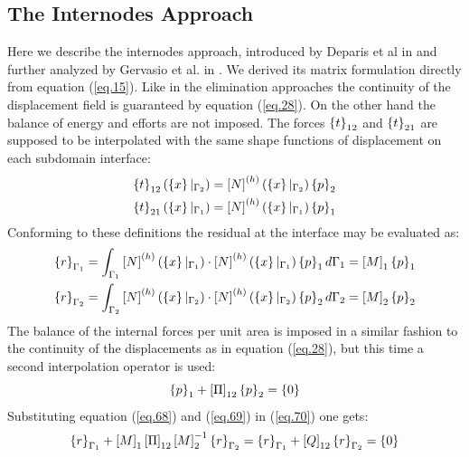 \subsection{The Internodes Approach}\label{ssec35}
Here we describe the internodes approach, introduced by Deparis et al in \cite{deparis2016internodes} and further analyzed by Gervasio et al. in \cite{gervasio2016analysis}. We derived its matrix formulation directly from equation (\ref{eq.15}). Like in the elimination approaches the continuity of the displacement field is guaranteed by equation (\ref{eq.28}). On the other hand the balance of energy and efforts are not imposed. The forces $\left\lbrace{t}\right \rbrace_{12}$ and $\left\lbrace{t}\right \rbrace_{21}$ are supposed to be interpolated with the same shape functions of displacement on each subdomain interface:
\begin{eqnarray}
\label{eq.66}
 \left\lbrace{t}\right \rbrace_{12}(\left\lbrace{x}\right \rbrace|_{\Gamma_2})=\left[{N}\right]^{(h)}(\left\lbrace{x}\right \rbrace|_{\Gamma_2}) \left\lbrace{p}\right \rbrace_{2}\\
 \label{eq.67}
 \left\lbrace{t}\right \rbrace_{21}(\left\lbrace{x}\right \rbrace|_{\Gamma_1})=\left[{N}\right]^{(h)}(\left\lbrace{x}\right \rbrace|_{\Gamma_1}) \left\lbrace{p}\right \rbrace_{1}
\end{eqnarray}
Conforming to these definitions the residual at the interface may be evaluated as:
\begin{eqnarray}
\label{eq.68}
 \left\lbrace{r}\right \rbrace_{\Gamma_1}=\int_{\Gamma_1}\left[{N}\right]^{(h)}(\left\lbrace{x}\right \rbrace|_{\Gamma_1})\cdot\left[{N}\right]^{(h)}(\left\lbrace{x}\right \rbrace|_{\Gamma_1}) \left\lbrace{p}\right \rbrace_{1}d\Gamma_1=\left[{M}\right]_1\left\lbrace{p}\right \rbrace_{1}\\
 \label{eq.69}
\left\lbrace{r}\right \rbrace_{\Gamma_2}=\int_{\Gamma_2}\left[{N}\right]^{(h)}(\left\lbrace{x}\right \rbrace|_{\Gamma_2})\cdot\left[{N}\right]^{(h)}(\left\lbrace{x}\right \rbrace|_{\Gamma_2}) \left\lbrace{p}\right \rbrace_{2}d\Gamma_2=\left[{M}\right]_2\left\lbrace{p}\right \rbrace_{2}
\end{eqnarray}
The balance of the internal forces per unit area is imposed in a similar fashion to the continuity of the displacements as in equation (\ref{eq.28}), but this time a second interpolation operator is used:
\begin{equation}
\label{eq.70}
\left\lbrace{p}\right \rbrace_{1}+\left[{\Pi}\right]_{12}\left\lbrace{p}\right \rbrace_{2}=\left\lbrace{0}\right \rbrace
\end{equation}
Substituting equation (\ref{eq.68}) and (\ref{eq.69}) in (\ref{eq.70}) one gets:
\begin{equation}
\label{eq.71}
\left\lbrace{r}\right \rbrace_{\Gamma_1}+\left[{M}\right]_1\left[{\Pi}\right]_{12}\left[{M}\right]_2^{-1}\left\lbrace{r}\right \rbrace_{\Gamma_2}=\left\lbrace{r}\right \rbrace_{\Gamma_1}+\left[{Q}\right]_{12}\left\lbrace{r}\right \rbrace_{\Gamma_2}=\left\lbrace{0}\right \rbrace
\end{equation}
